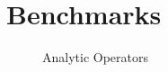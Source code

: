 \clearpage{}
\section{Benchmarks}

\begin{figure}
\begin{code}

\end{code}
\caption{Analytic Operators}
\end{figure}
